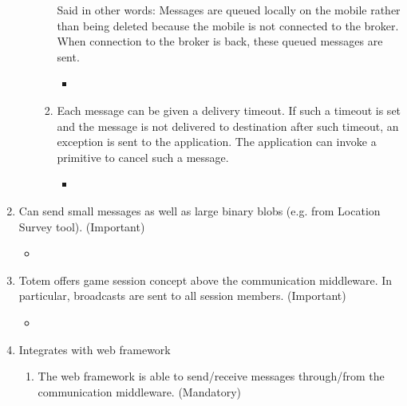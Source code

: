 \begin{enumerate}
\begin{enumerate}
\begin{enumerate}
  Said in other words: Messages are queued locally on the mobile
  rather than being deleted because the mobile is not connected to the
  broker. When connection to the broker is back, these queued messages are
  sent.
\label{R_3_c_i}
\begin{itemize}
\item \postponed
\end{itemize}
\item Each message can be given a delivery timeout. If such a timeout
  is set and the message is not delivered to destination after such
  timeout, an exception is sent to the application. The application
  can invoke a primitive to cancel such a message.
\label{R_3_c_ii}
\begin{itemize}
\item \postponed
\end{itemize}
\end{enumerate}
\end{enumerate}
\item Can send small messages as well as large binary blobs (e.g. from
  Location Survey tool). (Important)
\label{R_4}
\begin{itemize}
\item {}
\end{itemize}
\item Totem offers game session concept above the communication
  middleware. In particular, broadcasts are sent to all session
  members. (Important)
\label{R_5}
\begin{itemize}
\item {}
\end{itemize}
\item Integrates with web framework
\label{R_8}
\begin{enumerate}
\item The web framework is able to send/receive messages through/from
  the communication middleware. (Mandatory)
\label{R_6_a}
\begin{itemize}

\end{itemize}
\end{enumerate}
\end{enumerate}

